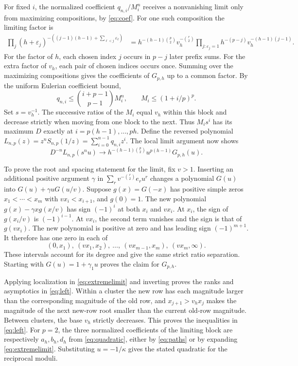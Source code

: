 \documentclass[11pt]{article}
\begin{document}
For fixed \(i\), the normalized coefficient \(q_{n,i}/M_i^n\) receives a nonvanishing limit only from maximizing compositions, by \eqref{eq:coef}. For one such composition the limiting factor is
\begin{align*}
 \prod_j(h+\varepsilon_j)^{-((j-1)(h-1)+\sum_{\ell<j}\varepsilon_\ell)}
 &=h^{-(h-1)\binom p2} v_h^{-\binom r2}
   \prod_{j:\varepsilon_j=1}h^{-(p-j)}v_h^{-(h-1)(j-1)}.
\end{align*}
For the factor of \(h\), each chosen index \(j\) occurs in \(p-j\) later prefix sums. For the extra factor of \(v_h\), each pair of chosen indices occurs once. Summing over the maximizing compositions gives the coefficients of \(G_{p,h}\) up to a common factor. By the uniform Eulerian coefficient bound,
\[
 q_{n,i}\le \binom{i+p-1}{p-1}M_i^n,\qquad M_i\le(1+i/p)^p.
\]
Set \(s=v_h^{-1}\). The successive ratios of the \(M_i\) equal \(v_h\) within this block and decrease strictly when moving from one block to the next. Thus \(M_i s^i\) has its maximum \(D\) exactly at \(i=p(h-1),\ldots,ph\). Define the reversed polynomial \(L_{n,p}(z)=z^n S_{n,p}(1/z)=\sum_{i=0}^{n-1}q_{n,i}z^i\). The local limit argument now shows
\begin{equation}\label{eq:extremelimit}
 D^{-n}L_{n,p}(s^n u)\longrightarrow h^{-(h-1)\binom p2} u^{p(h-1)}G_{p,h}(u).
\end{equation}

To prove the root and spacing statement for the limit, fix \(v>1\). Inserting an additional positive argument \(\gamma\) in \(\sum_r v^{-\binom r2}e_r u^r\) changes a polynomial \(G(u)\) into \(G(u)+\gamma uG(u/v)\). Suppose \(g(x)=G(-x)\) has positive simple zeros \(x_1<\cdots<x_m\) with \(vx_i<x_{i+1}\), and \(g(0)=1\). The new polynomial \(g(x)-\gamma x g(x/v)\) has sign \((-1)^i\) at both \(x_i\) and \(vx_i\). At \(x_i\), the sign of \(g(x_i/v)\) is \((-1)^{i-1}\). At \(vx_i\), the second term vanishes and the sign is that of \(g(vx_i)\). The new polynomial is positive at zero and has leading sign \((-1)^{m+1}\). It therefore has one zero in each of
\[
 (0,x_1),\ (vx_1,x_2),\ \ldots,\ (vx_{m-1},x_m),\ (vx_m,\infty).
\]
These intervals account for its degree and give the same strict ratio separation. Starting with \(G(u)=1+\gamma_1u\) proves the claim for \(G_{p,h}\).

Applying localization in \eqref{eq:extremelimit} and inverting proves the ranks and asymptotics in \eqref{eq:left}. Within a cluster the new row has each magnitude larger than the corresponding magnitude of the old row, and \(x_{j+1}>v_hx_j\) makes the magnitude of the next new-row root smaller than the current old-row magnitude. Between clusters, the base \(v_h\) strictly decreases. This proves the inequalities in \eqref{eq:left}. For \(p=2\), the three normalized coefficients of the limiting block are respectively \(a_h,b_h,d_h\) from \eqref{eq:quadratic}, either by \eqref{eq:paths} or by expanding \eqref{eq:extremelimit}. Substituting \(u=-1/\kappa\) gives the stated quadratic for the reciprocal moduli.
\end{document}
